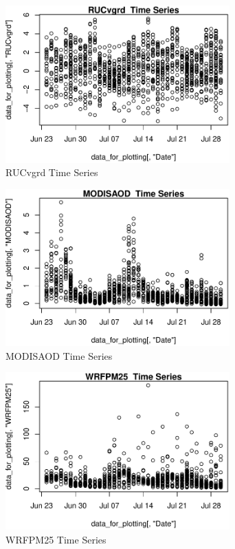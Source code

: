 \begin{figure} 
\centering  
\includegraphics[width=0.77\textwidth]{Code_Outputs/ML_input_report_AllforCaret_cleaned_StepPractice_part_practice_RUCvgrdTS.pdf} 
\caption{\label{fig:ML_input_report_AllforCaret_cleaned_StepPractice_part_practiceRUCvgrdTS}RUCvgrd  Time Series} 
\end{figure} 
 

\begin{figure} 
\centering  
\includegraphics[width=0.77\textwidth]{Code_Outputs/ML_input_report_AllforCaret_cleaned_StepPractice_part_practice_MODISAODTS.pdf} 
\caption{\label{fig:ML_input_report_AllforCaret_cleaned_StepPractice_part_practiceMODISAODTS}MODISAOD  Time Series} 
\end{figure} 
 

\begin{figure} 
\centering  
\includegraphics[width=0.77\textwidth]{Code_Outputs/ML_input_report_AllforCaret_cleaned_StepPractice_part_practice_WRFPM25TS.pdf} 
\caption{\label{fig:ML_input_report_AllforCaret_cleaned_StepPractice_part_practiceWRFPM25TS}WRFPM25  Time Series} 
\end{figure} 
 

